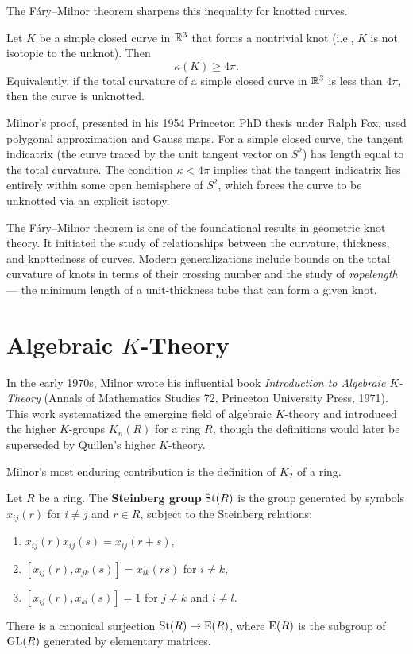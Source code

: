 The F\'ary--Milnor theorem sharpens this inequality for knotted curves.

\begin{theorem}
Let \(K\) be a simple closed curve in \(\mathbb{R}^3\) that forms a nontrivial knot (i.e., \(K\) is not isotopic to the unknot). Then
\[
\kappa(K) \geq 4\pi.
\]
Equivalently, if the total curvature of a simple closed curve in \(\mathbb{R}^3\) is less than \(4\pi\), then the curve is unknotted.
\end{theorem}

Milnor's proof, presented in his 1954 Princeton PhD thesis under Ralph Fox, used polygonal approximation and Gauss maps. For a simple closed curve, the tangent indicatrix (the curve traced by the unit tangent vector on \(S^2\)) has length equal to the total curvature. The condition \(\kappa < 4\pi\) implies that the tangent indicatrix lies entirely within some open hemisphere of \(S^2\), which forces the curve to be unknotted via an explicit isotopy.

The F\'ary--Milnor theorem is one of the foundational results in geometric knot theory. It initiated the study of relationships between the curvature, thickness, and knottedness of curves. Modern generalizations include bounds on the total curvature of knots in terms of their crossing number and the study of \textit{ropelength} --- the minimum length of a unit-thickness tube that can form a given knot.

\section{Algebraic \texorpdfstring{\(K\)}{K}-Theory}

In the early 1970s, Milnor wrote his influential book \textit{Introduction to Algebraic \(K\)-Theory} (Annals of Mathematics Studies 72, Princeton University Press, 1971). This work systematized the emerging field of algebraic \(K\)-theory and introduced the higher \(K\)-groups \(K_n(R)\) for a ring \(R\), though the definitions would later be superseded by Quillen's higher \(K\)-theory.

Milnor's most enduring contribution is the definition of \(K_2\) of a ring.

\begin{definition}
Let \(R\) be a ring. The \textbf{Steinberg group} \(\operatorname{St}(R)\) is the group generated by symbols \(x_{ij}(r)\) for \(i \neq j\) and \(r \in R\), subject to the Steinberg relations:
\begin{enumerate}
    \item \(x_{ij}(r) x_{ij}(s) = x_{ij}(r+s)\),
    \item \([x_{ij}(r), x_{jk}(s)] = x_{ik}(rs)\) for \(i \neq k\),
    \item \([x_{ij}(r), x_{kl}(s)] = 1\) for \(j \neq k\) and \(i \neq l\).
\end{enumerate}
There is a canonical surjection \(\operatorname{St}(R) \to \operatorname{E}(R)\), where \(\operatorname{E}(R)\) is the subgroup of \(\operatorname{GL}(R)\) generated by elementary matrices.
\end{definition}

